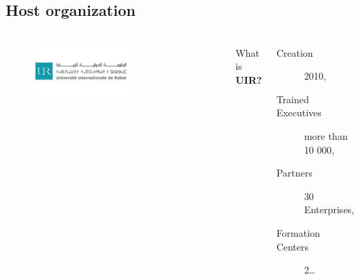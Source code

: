 \subsection{Host organization}
\begin{frame}
  \frametitle{\insertsectionhead}
  \framesubtitle{\insertsubsectionhead}

  \begin{columns}[T,onlytextwidth]
    \begin{figure}
      \includegraphics[width=0.6\textwidth]{images/logo-uir2.jpg}
    \end{figure}
    What is \textbf{\textsc{UIR?}}
    \begin{description}
      \item[Creation] 2010,
      \item[Trained Executives] more than 10 000,
      \item[Partners] 30 Enterprises,
      \item[Formation Centers] 2\dots
    \end{description}
  \end{columns}
\end{frame}


